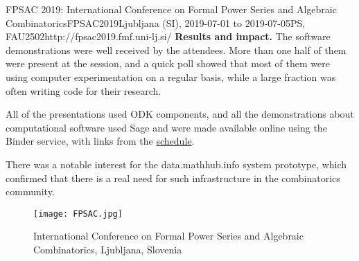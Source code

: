 \begin{event}{FPSAC 2019: International Conference on Formal Power Series and Algebraic Combinatorics}{FPSAC2019}{Ljubljana (SI),
  2019-07-01 to
  2019-07-05}{PS, FAU}{250}{2}{http://fpsac2019.fmf.uni-lj.si/}
\textbf{Results and impact.} The software demonstrations were well
received by the attendees. More than one half of them were
present at the session, and a quick poll showed that most of them were
using computer experimentation on a regular basis, while a large
fraction was often writing code for their research.

All of the presentations used ODK components, and all the
demonstrations about computational software used Sage and were made
available online using the Binder service, with links from the
\href{http://fpsac2019.fmf.uni-lj.si/schedule/}{schedule}.

There was a notable interest for the \textsf{data.math\-hub.info}
system prototype, which confirmed that there is a real need for such
infrastructure in the combinatorics community.

\begin{figure}[ht]
  \texttt{[image: FPSAC.jpg]}
  \caption*{International Conference on Formal Power Series and Algebraic Combinatorics, Ljubljana, Slovenia}
\end{figure}

\end{event}
